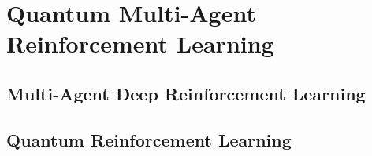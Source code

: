 
\chapter{Quantum Multi-Agent Reinforcement Learning}\label{chapter:Quantum Multi-Agent Reinforcement Learning}


\section{Multi-Agent Deep Reinforcement Learning}


\section{Quantum Reinforcement Learning}